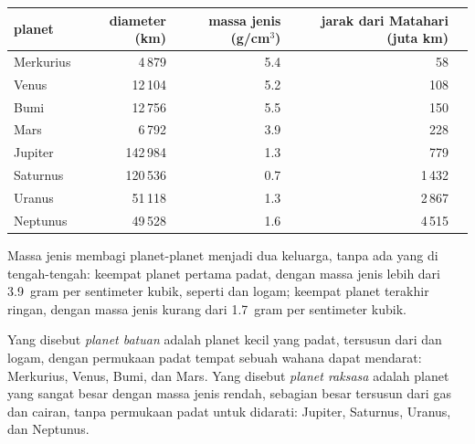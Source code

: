 \begin{center}
\small
\begin{tabular}{lrrrr}
\hline
planet & diameter (km) & massa jenis (g/cm$^3$) & jarak dari Matahari (juta km)\\
\hline
Merkurius & 4\,879 & 5.4 & 58\\
Venus & 12\,104 & 5.2 & 108\\
Bumi & 12\,756 & 5.5 & 150\\
Mars & 6\,792 & 3.9 & 228\\
\hline
Jupiter & 142\,984 & 1.3 & 779\\
Saturnus & 120\,536 & 0.7 & 1\,432\\
Uranus & 51\,118 & 1.3 & 2\,867\\
Neptunus & 49\,528 & 1.6 & 4\,515\\
\hline
\end{tabular}
\end{center}

Massa jenis membagi planet-planet menjadi dua keluarga, tanpa ada yang di
tengah-tengah: keempat planet pertama padat, dengan massa jenis lebih dari
3.9~gram per sentimeter kubik, seperti  dan logam; keempat planet
terakhir ringan, dengan massa jenis kurang dari 1.7~gram per sentimeter
kubik.

\begin{definition}\label{def:g6:earth-a-planet:planet-types}
Yang disebut \emph{planet batuan} adalah planet kecil
yang padat, tersusun dari  dan logam, dengan permukaan padat tempat
sebuah wahana dapat mendarat: Merkurius, Venus, Bumi, dan Mars. Yang disebut
\emph{planet raksasa} adalah planet yang sangat besar
dengan massa jenis rendah, sebagian besar tersusun dari gas dan cairan,
tanpa permukaan padat untuk didarati: Jupiter, Saturnus, Uranus, dan
Neptunus.
\end{definition}

